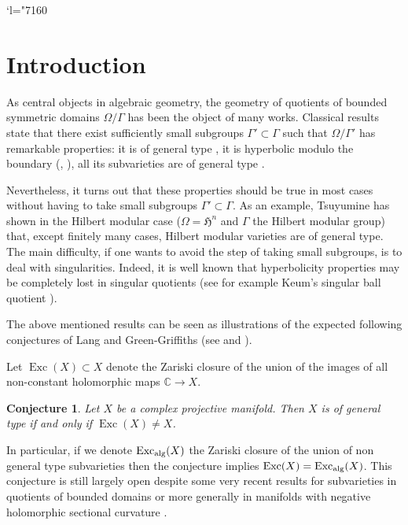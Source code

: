 \documentclass[JEP,XML,SOM,Unicode]{cedram}
\newcommand{\Changel}{\mathcode`l="7160}
\theoremstyle{plain}
\newtheorem{conjecture}[theorem]{Conjecture}
\theoremstyle{definition}
\numberwithin{equation}{theorem}
\DeclareMathOperator{\Exc}{Exc}
\newcommand\CC{\mathbb C}
\newcommand\HH{\mathfrak H}
\begin{document}
\maketitle
\vspace*{-\baselineskip}
\tableofcontents
\mainmatter
\bgroup
\Changel

\section{Introduction}
As central objects in algebraic geometry, the geometry of quotients of bounded symmetric domains $\Omega/\Gamma$ has been the object of many works. Classical results state that there exist sufficiently small subgroups $\Gamma' \subset \Gamma$ such that $\Omega/\Gamma'$ has remarkable properties: it is of general type \cite{Mum77}, it is hyperbolic modulo the boundary (\cite{Na89}, \cite{Rou16}), all its subvarieties are of general type \cite{Bru}.

Nevertheless, it turns out that these properties should be true in most cases without having to take small subgroups $\Gamma' \subset \Gamma$. As an example, Tsuyumine \cite{Tsu85} has shown in the Hilbert modular case ($\Omega=\HH^n$ and $\Gamma$ the Hilbert modular group) that, except finitely many cases, Hilbert modular varieties are of general type. The main difficulty, if one wants to avoid the step of taking small subgroups, is to deal with singularities. Indeed, it is well known that hyperbolicity properties may be completely lost in singular quotients (see for example Keum's singular ball quotient \cite{Keum08}).

The above mentioned results can be seen as illustrations of the expected following conjectures of Lang and Green-Griffiths (see \cite{Lan86} and \cite{GG80}).

Let $\Exc(X) \subset X$ denote the Zariski closure of the union of the images of all non-constant holomorphic maps $\CC \to X$.

\begin{conjecture}\label{Lang}
Let $X$ be a complex projective manifold. Then $X$ is of general type if and only if $\Exc(X) \neq X$.
\end{conjecture}

In particular, if we denote $\Exc_{\textup{alg}}(X)$ the Zariski closure of the union of non general type subvarieties then the conjecture implies $\Exc(X)=\Exc_{\textup{alg}}(X)$.
This conjecture is still largely open despite some very recent results for subvarieties in quotients of bounded domains \cite{BD18} or more generally in manifolds with negative holomorphic sectional curvature \cite{G18}.
\end{document}
